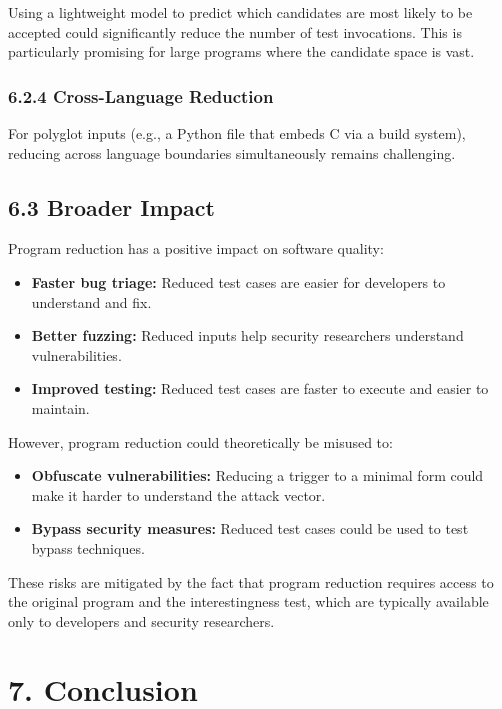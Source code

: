 \documentclass[
  letterpaper,
]{article}
\providecommand{\tightlist}{%
  \setlength{\itemsep}{0pt}\setlength{\parskip}{0pt}}
\begin{document}
Using a lightweight model to predict which candidates are most likely to
be accepted could significantly reduce the number of test invocations.
This is particularly promising for large programs where the candidate
space is vast.

\subsubsection{6.2.4 Cross-Language
Reduction}\label{cross-language-reduction}

For polyglot inputs (e.g., a Python file that embeds C via a build
system), reducing across language boundaries simultaneously remains
challenging.

\subsection{6.3 Broader Impact}\label{broader-impact}

Program reduction has a positive impact on software quality:

\begin{itemize}
\tightlist
\item
  \textbf{Faster bug triage:} Reduced test cases are easier for
  developers to understand and fix.
\item
  \textbf{Better fuzzing:} Reduced inputs help security researchers
  understand vulnerabilities.
\item
  \textbf{Improved testing:} Reduced test cases are faster to execute
  and easier to maintain.
\end{itemize}

However, program reduction could theoretically be misused to:

\begin{itemize}
\tightlist
\item
  \textbf{Obfuscate vulnerabilities:} Reducing a trigger to a minimal
  form could make it harder to understand the attack vector.
\item
  \textbf{Bypass security measures:} Reduced test cases could be used to
  test bypass techniques.
\end{itemize}

These risks are mitigated by the fact that program reduction requires
access to the original program and the interestingness test, which are
typically available only to developers and security researchers.

\section{7. Conclusion}\label{conclusion}
\end{document}

